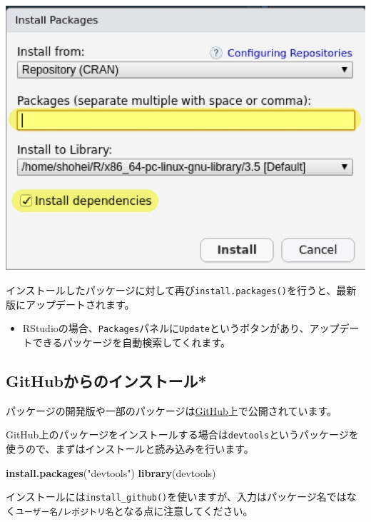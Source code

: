 \documentclass[]{bxjsreport}
\newenvironment{Shaded}{\begin{snugshade}}{\end{snugshade}}
\newcommand{\KeywordTok}[1]{\textcolor[rgb]{0.13,0.29,0.53}{\textbf{#1}}}
\newcommand{\NormalTok}[1]{#1}
\newcommand{\StringTok}[1]{\textcolor[rgb]{0.31,0.60,0.02}{#1}}
\providecommand{\tightlist}{%
  \setlength{\itemsep}{0pt}\setlength{\parskip}{0pt}}
\let\asdf\section
\renewcommand{\section}{\chapter}
\let\asdff\subsection
\renewcommand{\subsection}{\asdf}
\renewcommand{\subsubsection}{\asdff}
\begin{document}
\includegraphics{figures/intro_r3.jpg}

インストールしたパッケージに対して再び\texttt{install.packages()}を行うと、最新版にアップデートされます。

\begin{itemize}
\tightlist
\item
  RStudioの場合、\texttt{Packages}パネルに\texttt{Update}というボタンがあり、アップデートできるパッケージを自動検索してくれます。
\end{itemize}

\hypertarget{githubux304bux3089ux306eux30a4ux30f3ux30b9ux30c8ux30fcux30eb}{%
\subsubsection{GitHubからのインストール*}\label{githubux304bux3089ux306eux30a4ux30f3ux30b9ux30c8ux30fcux30eb}}

パッケージの開発版や一部のパッケージは\href{https://github.com/}{GitHub}上で公開されています。

GitHub上のパッケージをインストールする場合は\texttt{devtools}というパッケージを使うので、まずはインストールと読み込みを行います。

\begin{Shaded}
\begin{Highlighting}[]
\KeywordTok{install.packages}\NormalTok{(}\StringTok{"devtools"}\NormalTok{)}
\KeywordTok{library}\NormalTok{(devtools)}
\end{Highlighting}
\end{Shaded}

インストールには\texttt{install\_github()}を使いますが、入力はパッケージ名ではなく\texttt{ユーザー名/レポジトリ名}となる点に注意してください。
\end{document}
